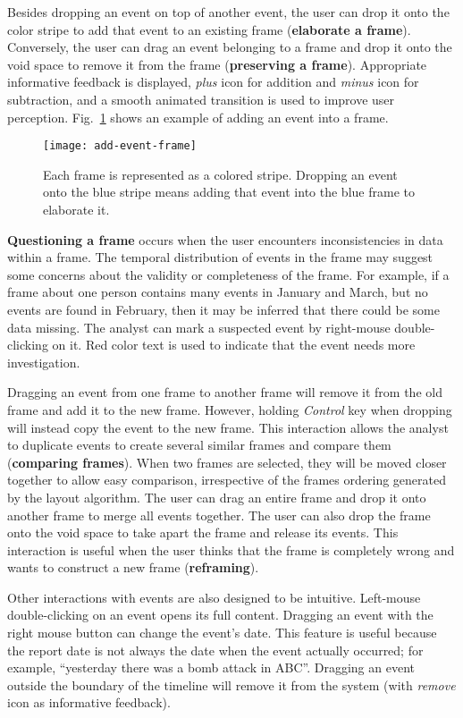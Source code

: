 Besides dropping an event on top of another event, the user can drop it onto the color stripe to add that event to an existing frame (\textbf{elaborate a frame}). Conversely, the user can drag an event belonging to a frame and drop it onto the void space to remove it from the frame (\textbf{preserving a frame}). Appropriate informative feedback is displayed, \textit{plus} icon for addition and \textit{minus} icon for subtraction, and a smooth animated transition is used to improve user perception. Fig.~\ref{fig:drag-drop-note} shows an example of adding an event into a frame.
\begin{figure}[ht]
\centering
\texttt{[image: add-event-frame]}
\caption{Each frame is represented as a colored stripe. Dropping an event onto the blue stripe means adding that event into the blue frame to elaborate it.}
\label{fig:drag-drop-note}
\end{figure}

\textbf{Questioning a frame} occurs when the user encounters inconsistencies in data within a frame. The temporal distribution of events in the frame may suggest some concerns about the validity or completeness of the frame. For example, if a frame about one person contains many events in January and March, but no events are found in February, then it may be inferred that there could be some data missing. The analyst can mark a suspected event by right-mouse double-clicking on it. Red color text is used to indicate that the event needs more investigation. 

Dragging an event from one frame to another frame will remove it from the old frame and add it to the new frame. However, holding \textit{Control} key when dropping will instead copy the event to the new frame. This interaction allows the analyst to duplicate events to create several similar frames and compare them (\textbf{comparing frames}). When two frames are selected, they will be moved closer together to allow easy comparison, irrespective of the frames ordering generated by the layout algorithm. The user can drag an entire frame and drop it onto another frame to merge all events together. The user can also drop the frame onto the void space to take apart the frame and release its events. This interaction is useful when the user thinks that the frame is completely wrong and wants to construct a new frame (\textbf{reframing}).

Other interactions with events are also designed to be intuitive. Left-mouse double-clicking on an event opens its full content. Dragging an event with the right mouse button can change the event's date. This feature is useful because the report date is not always the date when the event actually occurred; for example, ``yesterday there was a bomb attack in ABC''. Dragging an event outside the boundary of the timeline will remove it from the system (with \textit{remove} icon as informative feedback).

